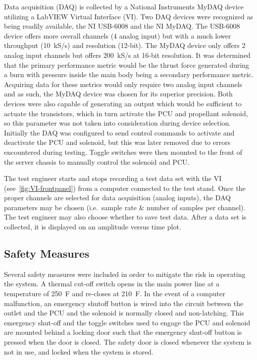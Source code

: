 \documentclass[journal]{IEEEtran}
\begin{document}
Data acquisition (DAQ) is collected by a National Instruments MyDAQ device utilizing a LabVIEW Virtual Interface (VI).
Two DAQ devices were recognized as being readily available, the NI USB-6008 and the NI MyDAQ.\@
The USB-6008 device offers more overall channels (4 analog input) but with a much lower throughput (\SI{10}{kS/s}) and resolution (12-bit).
The MyDAQ device only offers 2 analog input channels but offers \SI{200}{kS/s} at 16-bit resolution. It was determined that the primary performance metric would be the thrust force generated during a burn with pressure inside the main body being a secondary performance metric.
Acquiring data for these metrics would only require two analog input channels and as such, the MyDAQ device was chosen for its superior precision.
Both devices were also capable of generating an output which would be sufficient to actuate the transistors, which in turn activate the PCU and propellant solenoid, so this parameter was not taken into consideration during device selection.
Initially the DAQ was configured to send control commands to activate and deactivate the PCU and solenoid, but this was later removed due to errors encountered during testing. Toggle switches were then mounted to the front of the server chassis to manually control the solenoid and PCU.

The test engineer starts and stops recording a test data set with the VI (see~\autoref{fig:VI-frontpanel}) from a computer connected to the test stand.
Once the proper channels are selected for data acquisition (analog inputs), the DAQ parameters may be chosen (i.e.\ sample rate \& number of samples per channel).
The test engineer may also choose whether to save test data.
After a data set is collected, it is displayed on an amplitude versus time plot.

\subsection{Safety Measures}
Several safety measures were included in order to mitigate the risk in operating the system. A thermal cut-off switch opens in the main power line at a temperature of \SI{250}{F} and re-closes at \SI{210}{F}. In the event of a computer malfunction, an emergency shutoff button is wired into the circuit between the outlet and the PCU and the solenoid is normally closed and non-latching.
This emergency shut-off and the toggle switches used to engage the PCU and solenoid are mounted behind a locking door such that the emergency shut-off button is pressed when the door is closed.
The safety door is closed whenever the system is not in use, and locked when the system is stored.
\end{document}
